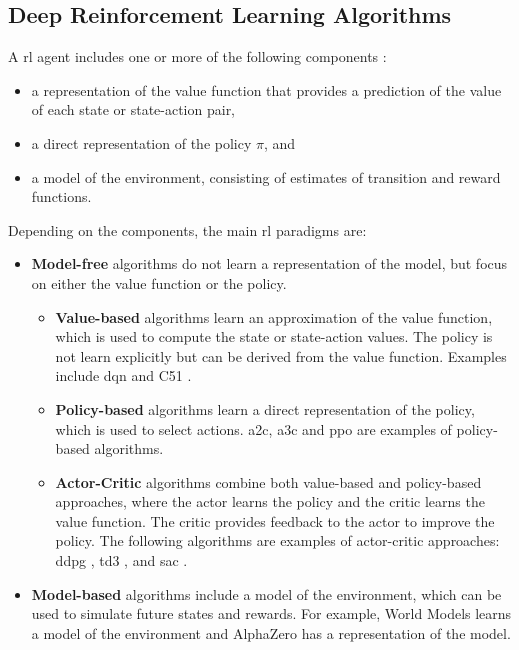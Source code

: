 \subsection{Deep Reinforcement Learning Algorithms} \label{sec:drlalgorithms}

A \acrlong{rl} agent includes one or more of the following components \cite{Francois-Lavet2018}:
\begin{itemize}
    \item a representation of the value function that provides a prediction of the value of each state or state-action pair,
    \item a direct representation of the policy $\pi$, and
    \item a model of the environment, consisting of estimates of transition and reward functions.
\end{itemize}

Depending on the components, the main \acrlong{rl} paradigms are: 
\begin{itemize}
    \item \textbf{Model-free} algorithms do not learn a representation of the model, but focus on either the value function or the policy. 
    \begin{itemize}
        \item \textbf{Value-based} algorithms learn an approximation of the value function, which is used to compute the state or state-action values. The policy is not learn explicitly but can be derived from the value function. Examples include \acrfull{dqn} \cite{Mnih2013} and C51 \cite{Bellemare2017}. 
        \item \textbf{Policy-based} algorithms learn a direct representation of the policy, which is used to select actions. \acrfull{a2c}, \acrfull{a3c} \cite{Mnih2016} and \acrfull{ppo} \cite{Schulman2017} are examples of policy-based algorithms.
        \item \textbf{Actor-Critic} algorithms combine both value-based and policy-based approaches, where the actor learns the policy and the critic learns the value function. The critic provides feedback to the actor to improve the policy. The following algorithms are examples of actor-critic approaches: \acrfull{ddpg} \cite{Lillicrap2015}, \acrfull{td3} \cite{Fujimoto2018}, and \acrfull{sac} \cite{Haarnoja2018}.
    \end{itemize}
    \item \textbf{Model-based} algorithms include a model of the environment, which can be used to simulate future states and rewards. For example, World Models \cite{HaGoogleBrainTokyo2018} learns a model of the environment and AlphaZero \cite{Silver2017} has a representation of the model. 
\end{itemize}

